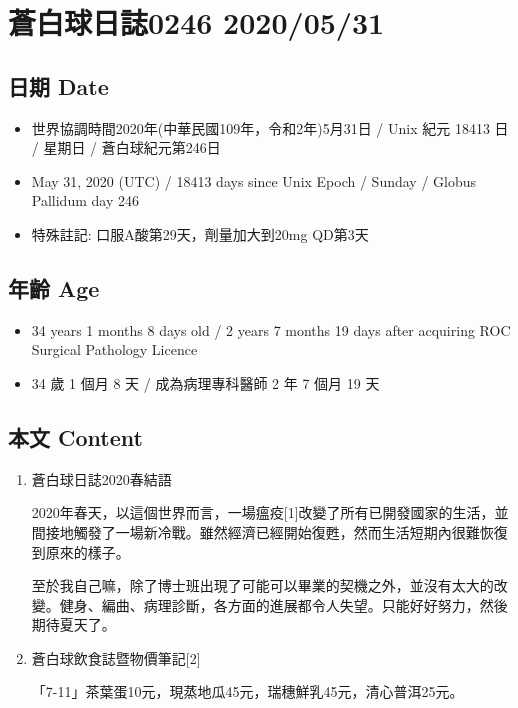 \documentclass[a5paper, 11pt
]{book}
\providecommand{\tightlist}{%
  \setlength{\itemsep}{0pt}\setlength{\parskip}{0pt}}
\begin{document}
\hypertarget{ux84bcux767dux7403ux65e5ux8a8c0246-20200531}{%
\section{蒼白球日誌0246
2020/05/31}\label{ux84bcux767dux7403ux65e5ux8a8c0246-20200531}}

\hypertarget{ux65e5ux671f-date-91}{%
\subsection{日期 Date}\label{ux65e5ux671f-date-91}}

\begin{itemize}
\tightlist
\item
  世界協調時間2020年(中華民國109年，令和2年)5月31日 / Unix 紀元 18413 日
  / 星期日 / 蒼白球紀元第246日
\item
  May 31, 2020 (UTC) / 18413 days since Unix Epoch / Sunday / Globus
  Pallidum day 246
\item
  特殊註記: 口服A酸第29天，劑量加大到20mg QD第3天
\end{itemize}

\hypertarget{ux5e74ux9f61-age-91}{%
\subsection{年齡 Age}\label{ux5e74ux9f61-age-91}}

\begin{itemize}
\tightlist
\item
  34 years 1 months 8 days old / 2 years 7 months 19 days after
  acquiring ROC Surgical Pathology Licence
\item
  34 歲 1 個月 8 天 / 成為病理專科醫師 2 年 7 個月 19 天
\end{itemize}

\hypertarget{ux672cux6587-content-91}{%
\subsection{本文 Content}\label{ux672cux6587-content-91}}

\begin{enumerate}
\def\labelenumi{\arabic{enumi}.}
\item
  蒼白球日誌2020春結語

  2020年春天，以這個世界而言，一場瘟疫{[}1{]}改變了所有已開發國家的生活，並間接地觸發了一場新冷戰。雖然經濟已經開始復甦，然而生活短期內很難恢復到原來的樣子。

  至於我自己嘛，除了博士班出現了可能可以畢業的契機之外，並沒有太大的改變。健身、編曲、病理診斷，各方面的進展都令人失望。只能好好努力，然後期待夏天了。
\item
  蒼白球飲食誌暨物價筆記{[}2{]}

  「7-11」茶葉蛋10元，現蒸地瓜45元，瑞穗鮮乳45元，清心普洱25元。
\end{enumerate}
\end{document}
